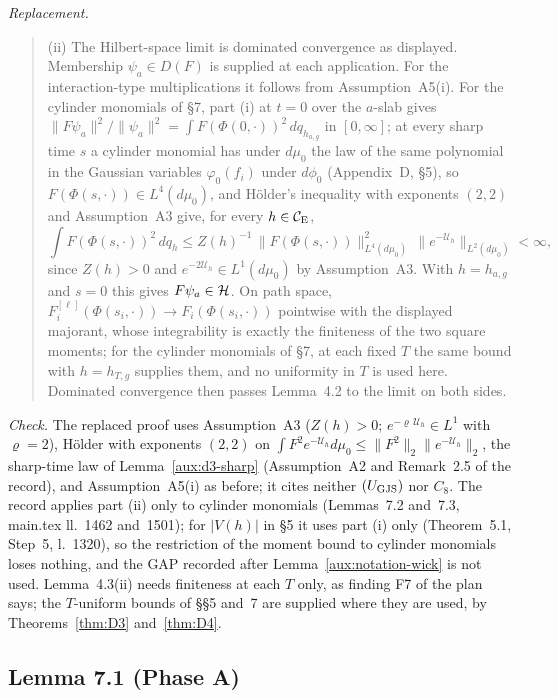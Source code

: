 \emph{Replacement.}
\begin{quote}\small
(ii) The Hilbert-space limit is dominated convergence as displayed.  Membership
$\psi_a\in D(F)$ is supplied at each application.  For the interaction-type multiplications it
follows from Assumption~A5(i).  For the cylinder monomials of \S7, part (i) at $t=0$ over the
$a$-slab gives $\|F\psi_a\|^2/\|\psi_a\|^2=\int F(\Phi(0,\cdot))^2\,dq_{h_{a,g}}$ in $[0,\infty]$;
at every sharp time $s$ a cylinder monomial has under $d\mu_0$ the law of the same polynomial in
the Gaussian variables $\varphi_0(f_i)$ under $d\phi_0$ (Appendix~D, \S5), so
$F(\Phi(s,\cdot))\in L^4(d\mu_0)$, and H\"older's inequality with exponents $(2,2)$ and
Assumption~A3 give, for every $h\in\mathcal{C}_{\mathrm E}$,
\[
 \int F(\Phi(s,\cdot))^2\,dq_h\le Z(h)^{-1}\,\|F(\Phi(s,\cdot))\|_{L^4(d\mu_0)}^2\,
 \|e^{-\mathcal U_h}\|_{L^2(d\mu_0)}<\infty ,
\]
since $Z(h)>0$ and $e^{-2\mathcal U_h}\in L^1(d\mu_0)$ by Assumption~A3.  With $h=h_{a,g}$ and
$s=0$ this gives $F\psi_a\in\mathcal{H}$.  On path space,
$F_i^{[\ell]}(\Phi(s_i,\cdot))\to F_i(\Phi(s_i,\cdot))$ pointwise with the displayed majorant,
whose integrability is exactly the finiteness of the two square moments; for the cylinder
monomials of \S7, at each fixed $T$ the same bound with $h=h_{T,g}$ supplies them, and no
uniformity in $T$ is used here.  Dominated convergence then passes Lemma~4.2 to the limit on both
sides.
\end{quote}
\emph{Check.}  The replaced proof uses Assumption~A3 ($Z(h)>0$; $e^{-\varrho\,\mathcal U_h}\in L^1$
with $\varrho=2$), H\"older with exponents $(2,2)$ on $\int F^2e^{-\mathcal U_h}d\mu_0\le
\|F^2\|_2\|e^{-\mathcal U_h}\|_2$, the sharp-time law of Lemma~\ref{aux:d3-sharp} (Assumption~A2
and Remark~2.5 of the record), and Assumption~A5(i) as before; it cites neither $(U_{\rm GJS})$ nor
$C_8$.  The record applies part (ii) only to cylinder monomials (Lemmas~7.2 and~7.3, main.tex
ll.~1462 and~1501); for $|V(h)|$ in \S5 it uses part (i) only (Theorem~5.1, Step~5, l.~1320), so
the restriction of the moment bound to cylinder monomials loses nothing, and the GAP recorded after
Lemma~\ref{aux:notation-wick} is not used.  Lemma~4.3(ii) needs finiteness at each $T$ only, as
finding F7 of the plan says; the $T$-uniform bounds of \S\S5 and~7 are supplied where they are
used, by Theorems~\ref{thm:D3} and~\ref{thm:D4}.

\subsection{Lemma 7.1 (Phase A)}\label{sub:cons-71}

